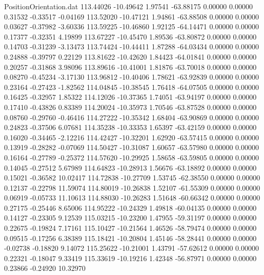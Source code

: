 \begin{filecontents}{PositionOrientation.dat}
 113.44026  -10.49642    1.97541   -63.88175    0.00000    0.00000    0.31532   -0.33517   -0.04169
 113.52020  -10.47121    1.94861   -63.88508    0.00000    0.00000    0.03627   -0.37982   -3.60336
 113.59225  -10.46860    1.92125   -64.14471    0.00000    0.00000    0.17377   -0.32351    4.19899
 113.67227  -10.45470    1.89536   -63.80872    0.00000    0.00000    0.14703   -0.31239   -3.13473
 113.74424  -10.44411    1.87288   -64.03434    0.00000    0.00000    0.24888   -0.39797    0.22129
 113.81622  -10.42620    1.84423   -64.01841    0.00000    0.00000    0.20257   -0.31868    3.98096
 113.89616  -10.41001    1.81876   -63.70018    0.00000    0.00000    0.08270   -0.45234   -3.17130
 113.96812  -10.40406    1.78621   -63.92839    0.00000    0.00000    0.23164   -0.27423   -1.82562
 114.04845  -10.38545    1.76418   -64.07505    0.00000    0.00000    0.16425   -0.32957    1.85322
 114.12026  -10.37365    1.74051   -63.94197    0.00000    0.00000    0.17410   -0.43826    0.83389
 114.20024  -10.35973    1.70546   -63.87528    0.00000    0.00000    0.08760   -0.29760   -0.46416
 114.27222  -10.35342    1.68404   -63.90869    0.00000    0.00000    0.24823   -0.37506    6.07681
 114.35238  -10.33353    1.65397   -63.42159    0.00000    0.00000    0.16020   -0.34465   -2.12216
 114.42427  -10.32201    1.62920   -63.57415    0.00000    0.00000    0.13919   -0.28282   -0.07069
 114.50427  -10.31087    1.60657   -63.57980    0.00000    0.00000    0.16164   -0.27789   -0.25372
 114.57620  -10.29925    1.58658   -63.59805    0.00000    0.00000    0.14045   -0.27512    5.67989
 114.64823  -10.28913    1.56676   -63.18892    0.00000    0.00000    0.15021   -0.36582   10.02417
 114.72838  -10.27709    1.53745   -62.38550    0.00000    0.00000    0.12137   -0.22798   11.59074
 114.80019  -10.26838    1.52107   -61.55309    0.00000    0.00000    0.06919   -0.05733   11.10613
 114.88030  -10.26283    1.51648   -60.66342    0.00000    0.00000    0.27175   -0.25446    8.65006
 114.95222  -10.24329    1.49818   -60.04135    0.00000    0.00000    0.14127   -0.23305    9.12539
 115.03215  -10.23200    1.47955   -59.31197    0.00000    0.00000    0.22675   -0.19824    7.17161
 115.10427  -10.21564    1.46526   -58.79474    0.00000    0.00000    0.09515   -0.17256    6.38389
 115.18421  -10.20804    1.45146   -58.28441    0.00000    0.00000   -0.02738   -0.18820    9.14072
 115.25622  -10.21001    1.43791   -57.62612    0.00000    0.00000    0.22321   -0.18047    9.33419
 115.33619  -10.19216    1.42348   -56.87971    0.00000    0.00000    0.23866   -0.24920   10.32970

\end{filecontents}
